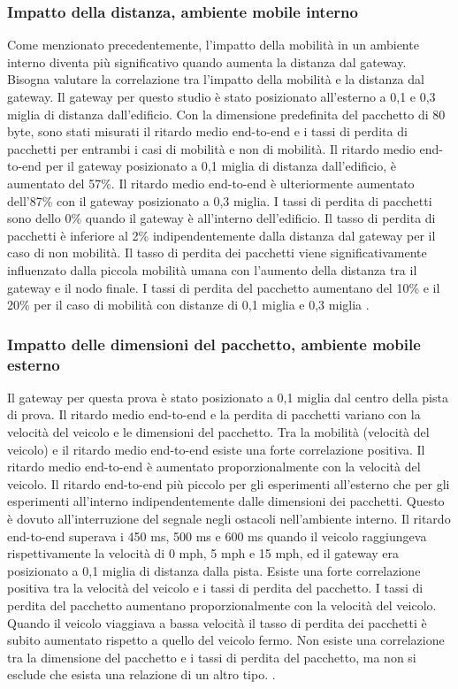 \documentclass[a4paper]{report} %
\begin{document}
\subsubsection{Impatto della distanza, ambiente mobile interno}
Come menzionato precedentemente, l'impatto della mobilità in un ambiente interno diventa più significativo quando aumenta la distanza dal gateway. Bisogna valutare la correlazione tra l'impatto della mobilità e la distanza dal gateway. Il gateway per questo studio è stato posizionato all'esterno a 0,1 e 0,3 miglia di distanza dall'edificio. Con la dimensione predefinita del pacchetto di 80 byte, sono stati misurati il ritardo medio end-to-end e i tassi di perdita di pacchetti per entrambi i casi di mobilità e non di mobilità. Il ritardo medio end-to-end per il gateway posizionato a 0,1 miglia di distanza dall'edificio, è aumentato del 57\%. Il ritardo medio end-to-end è ulteriormente aumentato dell'87\% con il gateway posizionato a 0,3 miglia.
I tassi di perdita di pacchetti sono dello 0\% quando il gateway è all'interno dell'edificio. Il tasso di perdita di pacchetti è inferiore al 2\% indipendentemente dalla distanza dal gateway per il caso di non mobilità. Il tasso di perdita dei pacchetti viene significativamente influenzato dalla piccola mobilità umana con l'aumento della distanza tra il gateway e il nodo finale.  
I tassi di perdita del pacchetto aumentano del 10\% e il 20\% per il caso di mobilità con distanze di 0,1 miglia e 0,3 miglia \cite{art:rif.47}.

\subsubsection{Impatto delle dimensioni del pacchetto, ambiente mobile esterno}
Il gateway per questa prova è stato posizionato a 0,1 miglia dal centro della pista di prova. 
Il ritardo medio end-to-end e la perdita di pacchetti variano con la velocità del veicolo e le dimensioni del pacchetto. 
Tra la mobilità (velocità del veicolo) e il ritardo medio end-to-end esiste una forte correlazione positiva.
Il ritardo medio end-to-end è aumentato proporzionalmente con la velocità del veicolo. 
Il ritardo end-to-end più piccolo per gli esperimenti all'esterno che per gli esperimenti all'interno indipendentemente dalle dimensioni dei pacchetti. Questo è dovuto all'interruzione del segnale negli ostacoli nell'ambiente interno. 
Il ritardo end-to-end superava i 450 ms, 500 ms e 600 ms quando il veicolo raggiungeva rispettivamente la velocità di 0 mph, 5 mph e 15 mph, ed il gateway era posizionato a 0,1 miglia di distanza dalla pista. Esiste una forte correlazione positiva tra la velocità del veicolo e i tassi di perdita del pacchetto. I tassi di perdita del pacchetto aumentano proporzionalmente con la velocità del veicolo. Quando il veicolo viaggiava a bassa velocità il tasso di perdita dei pacchetti è subito aumentato rispetto a quello del veicolo fermo. Non esiste una correlazione tra la dimensione del pacchetto e i tassi di perdita del pacchetto, ma non si esclude che esista una relazione di un altro tipo. \cite{art:rif.47}.
\end{document}
